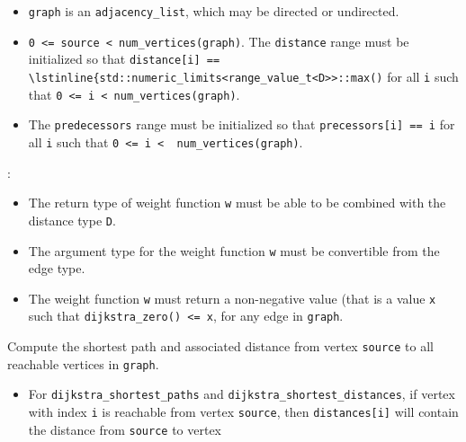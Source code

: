 \begin{itemdescr}
      \item\preconditions
      \begin{itemize}
            \item
                  \lstinline{graph} is an \lstinline{adjacency_list}, which may be directed or
                  undirected.
            \item
                  \lstinline{0 <= source < num_vertices(graph)}.
                  \pnum
                  The \lstinline{distance} range must be initialized so that
                  \lstinline{distance[i] == \lstinline{std::numeric_limits<range_value_t<D>>::max()}
                  for all \lstinline{i}
                  such that \lstinline{0 <= i < num_vertices(graph)}.  
            \item
                  The \lstinline{predecessors} range must be initialized so that
                  \lstinline{precessors[i] == i} for all \lstinline{i} such that
                  \lstinline{0 <= i <  num_vertices(graph)}.
      \end{itemize}
      \pnum\requires:
      \begin{itemize}
            \item
                  The return type of weight function \lstinline{w} must be able to
                  be combined with the distance type \lstinline{D}.
            \item
                  The argument type for the weight
                  function \lstinline{w} must be convertible from the edge type.
            \item
                  The weight function \lstinline{w} must return a non-negative value (that is
                  a value \lstinline{x} such that \lstinline{dijkstra_zero() <= x},
                  for any edge in \lstinline{graph}.
      \end{itemize}
      \pnum\effects
      Compute the shortest path and associated distance from vertex
      \lstinline{source} to all reachable vertices in \lstinline{graph}.
      \pnum\returns
      \begin{itemize}
            \item
                  For \lstinline{dijkstra_shortest_paths} and \lstinline{dijkstra_shortest_distances},
                  if vertex with index \lstinline{i} is reachable from vertex \lstinline{source}, then
                  \lstinline{distances[i]} will contain the distance from \lstinline{source} to vertex

\end{itemize}
\end{itemdescr}

